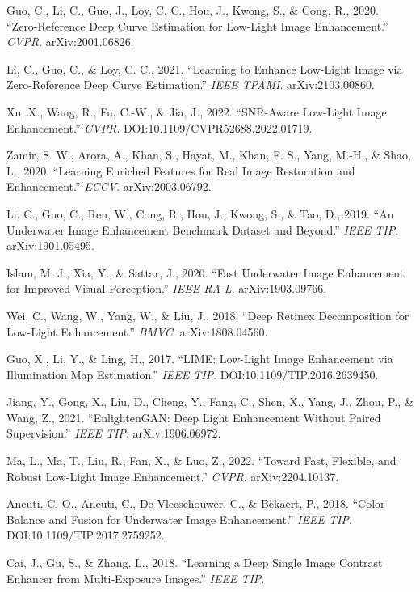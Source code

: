 \documentclass[11pt, letterpaper]{article}
\begin{document}
{\sloppy
\begin{enumerate}[label={[\arabic*]},leftmargin=*]
  \item Guo, C., Li, C., Guo, J., Loy, C. C., Hou, J., Kwong, S., \& Cong, R., 2020.
    ``Zero-Reference Deep Curve Estimation for Low-Light Image Enhancement.''
    \textit{CVPR}. arXiv:2001.06826.
  \item Li, C., Guo, C., \& Loy, C. C., 2021. ``Learning to Enhance Low-Light Image
    via Zero-Reference Deep Curve Estimation.'' \textit{IEEE TPAMI}. arXiv:2103.00860.
  \item Xu, X., Wang, R., Fu, C.-W., \& Jia, J., 2022. ``SNR-Aware Low-Light Image
    Enhancement.'' \textit{CVPR}. DOI:10.1109/CVPR52688.2022.01719.
  \item Zamir, S. W., Arora, A., Khan, S., Hayat, M., Khan, F. S., Yang, M.-H., \&
    Shao, L., 2020. ``Learning Enriched Features for Real Image Restoration and
    Enhancement.'' \textit{ECCV}. arXiv:2003.06792.
  \item Li, C., Guo, C., Ren, W., Cong, R., Hou, J., Kwong, S., \& Tao, D., 2019.
    ``An Underwater Image Enhancement Benchmark Dataset and Beyond.''
    \textit{IEEE TIP}. arXiv:1901.05495.
  \item Islam, M. J., Xia, Y., \& Sattar, J., 2020. ``Fast Underwater Image
    Enhancement for Improved Visual Perception.'' \textit{IEEE RA-L}.
    arXiv:1903.09766.
  \item Wei, C., Wang, W., Yang, W., \& Liu, J., 2018. ``Deep Retinex Decomposition
    for Low-Light Enhancement.'' \textit{BMVC}. arXiv:1808.04560.
  \item Guo, X., Li, Y., \& Ling, H., 2017. ``LIME: Low-Light Image Enhancement via
    Illumination Map Estimation.'' \textit{IEEE TIP}. DOI:10.1109/TIP.2016.2639450.
  \item Jiang, Y., Gong, X., Liu, D., Cheng, Y., Fang, C., Shen, X., Yang, J., Zhou,
    P., \& Wang, Z., 2021. ``EnlightenGAN: Deep Light Enhancement Without Paired
    Supervision.'' \textit{IEEE TIP}. arXiv:1906.06972.
  \item Ma, L., Ma, T., Liu, R., Fan, X., \& Luo, Z., 2022. ``Toward Fast, Flexible,
    and Robust Low-Light Image Enhancement.'' \textit{CVPR}. arXiv:2204.10137.
  \item Ancuti, C. O., Ancuti, C., De Vleeschouwer, C., \& Bekaert, P., 2018.
    ``Color Balance and Fusion for Underwater Image Enhancement.''
    \textit{IEEE TIP}. DOI:10.1109/TIP.2017.2759252.
  \item Cai, J., Gu, S., \& Zhang, L., 2018. ``Learning a Deep Single Image Contrast
    Enhancer from Multi-Exposure Images.'' \textit{IEEE TIP}.
\end{enumerate}
}
\end{document}
